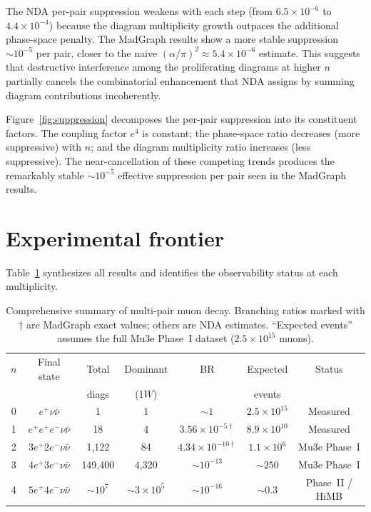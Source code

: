\documentclass[11pt,a4paper]{article}
\begin{document}
The NDA per-pair suppression weakens with each step (from
$6.5\times10^{-6}$ to $4.4\times10^{-4}$) because the diagram
multiplicity growth outpaces the additional phase-space penalty.
The MadGraph results show a more stable suppression
$\sim\!10^{-5}$ per pair, closer to the naive
$(\alpha/\pi)^2 \approx 5.4\times10^{-6}$ estimate.
This suggests that destructive interference among the proliferating
diagrams at higher $n$ partially cancels the combinatorial
enhancement that NDA assigns by summing diagram contributions
incoherently.

Figure~\ref{fig:suppression} decomposes the per-pair suppression into
its constituent factors.
The coupling factor $e^4$ is constant; the phase-space ratio decreases
(more suppressive) with $n$; and the diagram multiplicity ratio
increases (less suppressive).
The near-cancellation of these competing trends produces the
remarkably stable $\sim\!10^{-5}$ effective suppression per pair
seen in the MadGraph results.


\section{Experimental frontier}
\label{sec:frontier}

Table~\ref{tab:frontier} synthesizes all results and identifies the
observability status at each multiplicity.

\begin{table}[h]
\centering
\caption{Comprehensive summary of multi-pair muon decay.
Branching ratios marked with $\dagger$ are MadGraph exact values;
others are NDA estimates.
``Expected events'' assumes the full Mu3e Phase~I dataset
($2.5\times10^{15}$ muons).}
\label{tab:frontier}
\begin{tabular}{ccccccc}
\toprule
$n$ & Final state & Total & Dominant & BR & Expected & Status \\
    &             & diags & (1$W$)  &    & events   &        \\
\midrule
0 & $e^+\nu\bar\nu$ & 1 & 1
  & $\sim\!1$
  & $2.5\times10^{15}$
  & Measured \\
1 & $e^+e^+e^-\nu\bar\nu$ & 18 & 4
  & $3.56\times10^{-5\dagger}$
  & $8.9\times10^{10}$
  & Measured \\
2 & $3e^+2e^-\nu\bar\nu$ & 1{,}122 & 84
  & $4.34\times10^{-10\dagger}$
  & $1.1\times10^{6}$
  & Mu3e Phase~I \\
3 & $4e^+3e^-\nu\bar\nu$ & 149{,}400 & 4{,}320
  & $\sim\!10^{-13}$
  & $\sim\!250$
  & Mu3e Phase~I \\
4 & $5e^+4e^-\nu\bar\nu$ & $\sim\!10^7$ & $\sim\!3\times10^5$
  & $\sim\!10^{-16}$
  & $\sim\!0.3$
  & Phase~II / HiMB \\
\bottomrule
\end{tabular}
\end{table}
\end{document}

